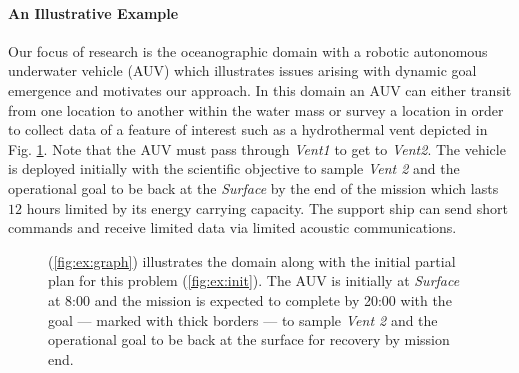 \paragraph{An Illustrative Example} 

Our focus of research is the oceanographic domain with a robotic
autonomous underwater vehicle (AUV) which illustrates issues arising with
dynamic goal emergence and motivates our approach.  In this domain an
AUV can either transit from one location to another within the water
mass or survey a location in order to collect data of a feature of
interest such as a hydrothermal vent depicted in
Fig. \ref{fig:Example}.  Note that the AUV must pass through {\em
  Vent1} to get to {\em Vent2}.  The vehicle is deployed initially
with the scientific objective to sample {\em Vent 2} and the
operational goal to be back at the {\em Surface} by the end of the
mission which lasts $12$ hours limited by its energy carrying
capacity. The support ship can send short commands and receive limited
data via limited acoustic communications.

\begin{figure}[!t]
  \centering
  \hfill {}
  \caption{\small{(\ref{fig:ex:graph}) illustrates the domain along
      with the initial partial plan for this problem
      (\ref{fig:ex:init}). The AUV is initially at {\em Surface} at
      8:00 and the mission is expected to complete by 20:00 with the
      goal --- marked with thick borders --- to sample {\em Vent 2}
      and the operational goal to be back at the surface for recovery
      by mission end.}}
  \label{fig:Example}
  \vskip-2mm
\end{figure}

